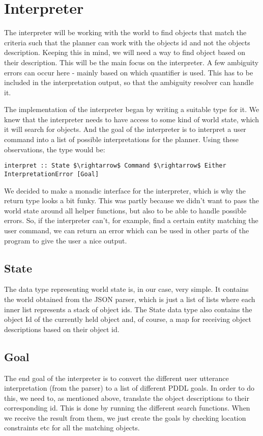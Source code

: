 \section*{Interpreter}
The interpreter will be working with the world to find objects that match the criteria such that the planner can work with the objects id and not the objects description. Keeping this in mind, we will need a way to find object based on their description. This will be the main focus on the interpreter. A few ambiguity errors can occur here - mainly based on which quantifier is used. This has to be included in the interpretation output, so that the ambiguity resolver can handle it.

The implementation of the interpreter began by writing a suitable type for it.
We knew that the interpreter needs to have access to some kind of world state, which it will search for objects.
And the goal of the interpreter is to interpret a user command into a list of possible interpretations for the planner.
Using these observations, the type would be:

\begin{lstlisting}
interpret :: State $\rightarrow$ Command $\rightarrow$ Either InterpretationError [Goal]
\end{lstlisting}

We decided to make a monadic interface for the interpreter, which is why the return type looks a bit funky.
This was partly because we didn't want to pass the world state around all helper functions, but also to be able to handle possible errors.
So, if the interpreter can't, for example, find a certain entity matching the user command, we can return an error which can be used in other parts of the program to give the user a nice output.

\subsection*{State}
The data type representing world state is, in our case, very simple.
It contains the world obtained from the JSON parser, which is just a list of lists where each inner list represents a stack of object ids.
The State data type also contains the object Id of the currently held object and, of course, a map for receiving object descriptions based on their object id.

\subsection*{Goal}
The end goal of the interpreter is to convert the different user utterance interpretation (from the parser) to a list of different PDDL goals.
In order to do this, we need to, as mentioned above, translate the object descriptions to their corresponding id.
This is done by running the different search functions.
When we receive the result from them, we just create the goals by checking location constraints etc for all the matching objects.

